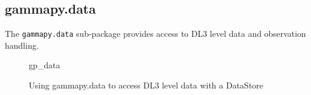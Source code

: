 \subsection{gammapy.data}
\label{ssec:gammapy-data}
The \verb|gammapy.data| sub-package provides access to DL3 level data and
observation handling.

\begin{figure}

	{gp_data}

	\caption{Using gammapy.data to access DL3 level data with a DataStore}
	\label{fig*:minted:gp_data}
\end{figure}
